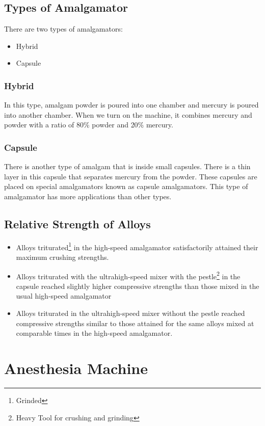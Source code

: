\documentclass[12pt]{article}
\begin{document}
 \subsection{Types of Amalgamator}
 There are two types of amalgamators:\cite{HTC:2020}
 \begin{itemize}
 \item[\ding{172}] Hybrid
 \item[\ding{173}] Capsule
 \end{itemize}
 
\subsubsection{Hybrid} 
 In this type, amalgam powder is poured into one chamber and mercury is poured into another chamber. When we turn on the machine, it combines mercury and powder with a ratio of 80\% powder and 20\% mercury.
\subsubsection{Capsule}
 There is another type of amalgam that is inside small capsules. There is a thin layer in this capsule that separates mercury from the powder. These capsules are placed on special amalgamators known as capsule amalgamators. This type of amalgamator has more applications than other types.
 
 \subsection{Relative Strength of Alloys}
 \begin{itemize}
 \item[\ding{110}] Alloys triturated\footnote{Grinded} in the high-speed amalgamator satisfactorily attained their maximum crushing strengths\cite{osborne1968compressive}.
 \item[\ding{110}] Alloys triturated with the ultrahigh-speed mixer with the pestle\footnote{Heavy Tool for crushing and grinding} in the capsule reached slightly higher compressive strengths than those mixed in the usual high-speed amalgamator
 
\item[\ding{110}] Alloys triturated in the ultrahigh-speed mixer without the pestle reached compressive strengths similar to those attained for the same alloys mixed at comparable times in the high-speed amalgamator.
 \end{itemize}
 
 \section{Anesthesia Machine}
\end{document}
